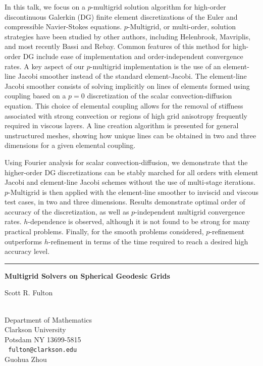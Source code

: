 \documentclass[twosided]{report}
\begin{document}
In this talk, we focus on a $p$-multigrid solution algorithm for
high-order discontinuous Galerkin (DG) finite element discretizations
of the Euler and compressible Navier-Stokes equations. $p$-Multigrid, or
multi-order, solution strategies have been studied by other authors,
including Helenbrook, Mavriplis, and most recently Bassi and Rebay.
Common features of this method for high-order DG include ease of
implementation and order-independent convergence rates. A key aspect of
our $p$-multigrid implementation is the use of an element-line Jacobi
smoother instead of the standard element-Jacobi. The element-line
Jacobi smoother consists of solving implicitly on lines of elements
formed using coupling based on a $p=0$ discretization of the scalar
convection-diffusion equation. This choice of elemental coupling allows
for the removal of stiffness associated with strong convection or
regions of high grid anisotropy frequently required in viscous layers.
A line creation algorithm is presented for general unstructured meshes,
showing how unique lines can be obtained in two and three dimensions
for a given elemental coupling.

Using Fourier analysis for scalar convection-diffusion, we demonstrate
that the higher-order DG discretizations can be stably marched for all
orders with element Jacobi and element-line Jacobi schemes without the
use of multi-stage iterations. $p$-Multigrid is then applied with the
element-line smoother to inviscid and viscous test cases, in two and
three dimensions. Results demonstrate optimal order of accuracy of the
discretization, as well as $p$-independent multigrid convergence rates.
$h$-dependence is observed, although it is not found to be strong for
many practical problems. Finally, for the smooth problems considered,
$p$-refinement outperforms $h$-refinement in terms of the time required to
reach a desired high accuracy level.



\begin{center} \rule{6in}{1pt} \end{center}
\newpage	%


\begin{center}
{\large			\label{fulton}
{\bf
Multigrid Solvers on Spherical Geodesic Grids
}

Scott R. Fulton} \\
Department of Mathematics
\\
Clarkson University
\\
Potsdam NY 13699-5815
\\ {\tt
fulton@clarkson.edu
}
\\
Guohua Zhou
\end{center}
\end{document}
